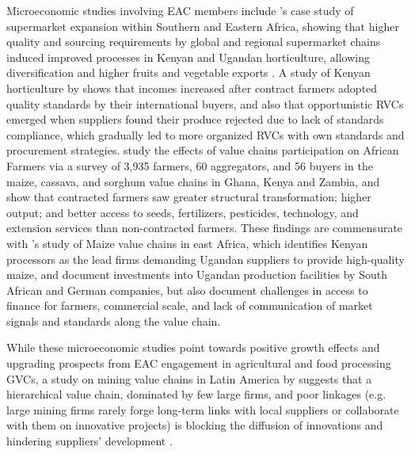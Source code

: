 \documentclass[a4paper]{article}
\begin{document}
Microeconomic studies involving EAC members include \citet{barrientos2016shifting}'s case study of supermarket expansion within Southern and Eastern Africa, showing that higher quality and sourcing requirements by global and regional supermarket chains induced improved processes in Kenyan and Ugandan horticulture, allowing diversification and higher fruits and vegetable exports \citep{world2020trading}. A study of Kenyan horticulture by \citet{krishnan2018origin} shows that incomes increased after contract farmers adopted quality standards by their international buyers, and also that opportunistic RVCs emerged when suppliers found their produce rejected due to lack of standards compliance, which gradually led to more organized RVCs with own standards and procurement strategies. \citet{dihel2018does} study the effects of value chains participation on African Farmers via a survey of 3,935 farmers, 60 aggregators, and 56 buyers in the maize, cassava, and sorghum value chains in Ghana, Kenya and Zambia, and show that contracted farmers saw greater structural transformation; higher output; and better access to seeds, fertilizers, pesticides, technology, and extension services than non-contracted farmers. These findings are commensurate with \citet{daly2016maize}'s study of Maize value chains in east Africa, which identifies Kenyan processors as the lead firms demanding Ugandan suppliers to provide high-quality maize, and document investments into Ugandan production facilities by South African and German companies, but also document challenges in access to finance for farmers, commercial scale, and lack of communication of market signals and standards along the value chain.    \newline

While these microeconomic studies point towards positive growth effects and upgrading prospects from EAC  engagement in agricultural and food processing GVCs, a study on mining value chains in Latin America by \citet{pietrobelli2018innovation} suggests that a hierarchical value chain, dominated by few large firms, and poor linkages (e.g. large mining firms rarely forge long-term links with local suppliers or collaborate with them on innovative projects) is blocking the diffusion of innovations and hindering suppliers’ development \citep{pietrobelli2018innovation, world2020trading}. 


\end{document}

